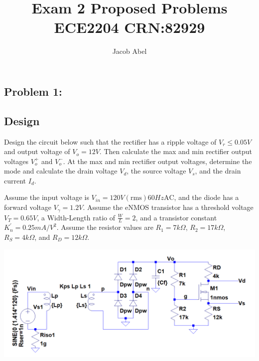 \documentclass[12pt,letterpaper,titlepage]{article}
\author{Jacob Abel}
\title{	Exam 2 Proposed Problems
	\\\large ECE2204 CRN:82929
}
\begin{document}
\maketitle
\begin{raggedright}

\section{Problem 1: } 
\subsection{Design}

Design the circuit below such that the rectifier has a ripple voltage of $V_r \leq 0.05V$ and output voltage of $V_o = 12V$. Then calculate the max and min rectifier output voltages $V_o^+$ and $V_o^-$. At the max and min rectifier output voltages, determine the mode and calculate the drain voltage $V_d$, the source voltage $V_s$, and the drain current $I_d$. 

Assume 
the input voltage is $V_{in} = 120V(\text{rms}) 60Hz \text{AC}$, and 
the diode has a forward voltage $V_\gamma = 1.2V$.
Assume the eNMOS transistor has 
a threshold voltage $V_T = 0.65V$,
a Width-Length ratio of $\frac{W}{L} = 2$, and
a transistor constant $K_n^\prime = 0.25mA/V^2$.
Assume the resistor values are 
$R_1 = 7k\Omega$, 
$R_2 = 17k\Omega$, 
$R_S = 4k\Omega$, and 
$R_D = 12k\Omega$.

\begin{center}
\includegraphics[width=\textwidth, height=\textheight, keepaspectratio=true]{ds1}
\end{center}



\end{raggedright}
\end{document}
